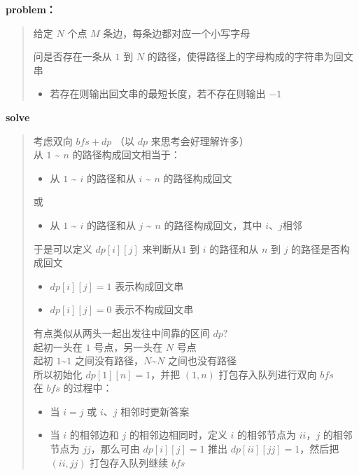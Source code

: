 \documentclass[E:/GsjzTle/main/main.tex]{subfiles}
\begin{document}
\textbf{problem：}

\begin{quote}
给定 \(N\) 个点 \(M\) 条边，每条边都对应一个小写字母

问是否存在一条从 \(1\) 到 \(N\)
的路径，使得路径上的字母构成的字符串为回文串

\begin{itemize}
\item
  若存在则输出回文串的最短长度，若不存在则输出 \(-1\)
\end{itemize}
\end{quote}

\textbf{solve}

\begin{quote}
考虑双向 \(bfs + dp\) （以 \(dp\) 来思考会好理解许多）\\
从 \(1\) \textasciitilde{} \(n\) 的路径构成回文相当于：

\begin{itemize}
\item
  从 \(1\) \textasciitilde{} \(i\) 的路径和从 \(i\) \textasciitilde{}
  \(n\) 的路径构成回文
\end{itemize}

或

\begin{itemize}
\item
  从 \(1\) \textasciitilde{} \(i\) 的路径和从 \(j\) \textasciitilde{}
  \(n\) 的路径构成回文，其中 \(i、j\)相邻
\end{itemize}

于是可以定义 \(dp[i][j]\) 来判断从\(1\) 到 \(i\) 的路径和从 \(n\) 到
\(j\) 的路径是否构成回文

\begin{itemize}
\item
  \(dp[i][j] = 1\) 表示构成回文串
\item
  \(dp[i][j] = 0\) 表示不构成回文串
\end{itemize}

有点类似从两头一起出发往中间靠的区间 \(dp?\) \\
起初一头在 \(1\) 号点，另一头在 \(N\) 号点\\
起初 \(1\)\textasciitilde{}\(1\)
之间没有路径，\(N\)\textasciitilde{}\(N\) 之间也没有路径\\
所以初始化 \(dp[1][n] = 1\)，并把 \((1,n)\) 打包存入队列进行双向
\(bfs\)\\
在 \(bfs\) 的过程中：

\begin{itemize}
\item
  当 \(i = j\) 或 \(i、j\) 相邻时更新答案
\item
  当 \(i\) 的相邻边和 \(j\) 的相邻边相同时，定义 \(i\) 的相邻节点为
  \(ii\)，\(j\) 的相邻节点为 \(jj\)，那么可由 \(dp[i][j] = 1\) 推出
  \(dp[ii][jj] = 1\)，然后把 \((ii,jj)\) 打包存入队列继续 \(bfs\)
\end{itemize}
\end{quote}
\end{document}
